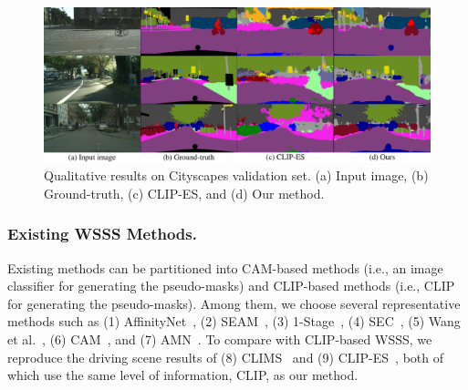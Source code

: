 \documentclass[letterpaper]{article} %
\def\ie{i.e.} \def\Ie{I.e.}
\begin{document}
\begin{figure}[t!]
\centering
\includegraphics[width=16cm]{figures/fig_qualitative_city.pdf}
\caption{Qualitative results on Cityscapes validation set. (a) Input image, (b) Ground-truth, (c) CLIP-ES, and (d) Our method.}
\label{fig:qualitative_city}
\end{figure}

\subsubsection{Existing WSSS Methods.} Existing methods can be partitioned into CAM-based methods (\ie, an image classifier for generating the pseudo-masks) and CLIP-based methods (\ie, CLIP for generating the pseudo-masks). Among them, we choose several representative methods such as (1) AffinityNet~\cite{ahn2018learning}, (2) SEAM~\cite{wang2020self}, (3) 1-Stage~\cite{araslanov2020single}, (4) SEC~\cite{kolesnikov2016seed}, (5) Wang et al.~\cite{wang2020deep}, (6) CAM~\cite{zhou2016learning}, and  (7) AMN~\cite{lee2022threshold}. To compare with CLIP-based WSSS, we reproduce the driving scene results of (8) CLIMS~\cite{Xie_2022_CVPR} and (9) CLIP-ES~\cite{Lin_2023_CVPR}, both of which use the same level of information, CLIP, as our method. 
\end{document}
